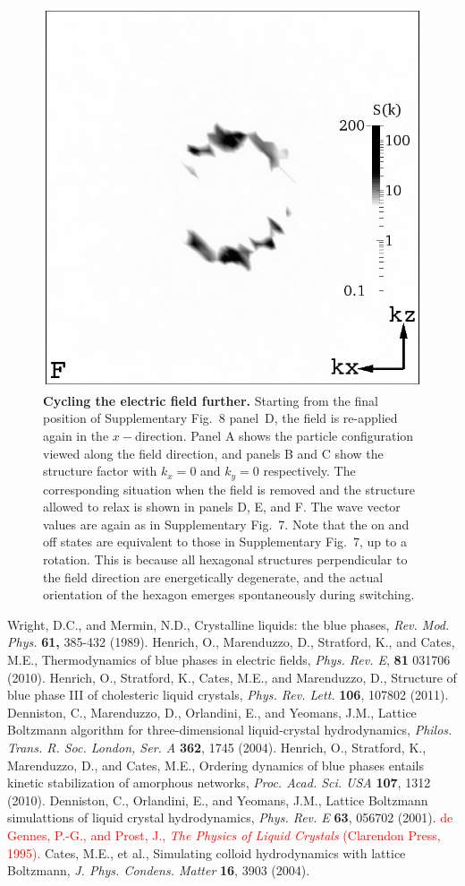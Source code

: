 \documentclass[12pt,twoside]{article}
\begin{document}
\begin{figure}[!h]
\begin{center}
\includegraphics[width=0.32\columnwidth]{sq_y_run1347.png}
\end{center}
\caption{\textbf{Cycling the electric field further.}
Starting from the final
position of Supplementary Fig.~8 panel~D, the field is re-applied
again in the $x-$direction. Panel A shows the particle configuration
viewed along the field direction, and panels B and C show the structure
factor with $k_x = 0$ and $k_y = 0$ respectively. The corresponding
situation when the field is removed and the structure allowed to relax
is shown in panels D, E, and F. The wave vector values are again as
in Supplementary Fig.~7. Note that the on and off states are 
equivalent to those in Supplementary Fig.~7, up to a rotation.
This is because all hexagonal structures perpendicular to the field
direction are energetically degenerate,
and the actual orientation of the hexagon emerges spontaneously during
switching. }
\end{figure}

\vfill
\pagebreak


\begin{thebibliography}{99}

Wright, D.C., and Mermin, N.D.,
Crystalline liquids: the blue phases,
{\it Rev. Mod. Phys.} {\bf 61,} 385-432 (1989).
Henrich, O., Marenduzzo, D., Stratford, K., and Cates, M.E.,
Thermodynamics of blue phases in electric fields,
\textit{Phys. Rev. E}, \textbf{81} 031706 (2010).
Henrich, O., Stratford, K., Cates, M.E., and Marenduzzo, D.,
Structure of blue phase III of cholesteric liquid crystals,
{\it Phys. Rev. Lett.} {\bf 106}, 107802 (2011).
Denniston, C., Marenduzzo, D., Orlandini, E., and  Yeomans, J.M.,
Lattice Boltzmann algorithm for three-dimensional liquid-crystal
hydrodynamics,
\textit{Philos. Trans. R. Soc. London, Ser. A} \textbf{362}, 1745 (2004).
Henrich, O., Stratford, K.,  Marenduzzo, D., and Cates, M.E.,
Ordering dynamics of blue phases entails kinetic stabilization of
amorphous networks, 
\textit{Proc. Acad. Sci. USA} \textbf{107}, 1312 (2010).
Denniston, C., Orlandini, E., and Yeomans, J.M.,
Lattice Boltzmann simulattions of liquid crystal hydrodynamics,
\textit{Phys. Rev. E} \textbf{63}, 056702 (2001).
\textcolor{red}{de Gennes, P.-G., and  Prost, J.,
{\it The Physics of Liquid Crystals} (Clarendon Press, 1995).}
 Cates, M.E.,  et al.,
Simulating colloid hydrodynamics with lattice Boltzmann,
\textit{J. Phys. Condens. Matter} \textbf{16},  3903 (2004). 


\end{thebibliography}
\end{document}
